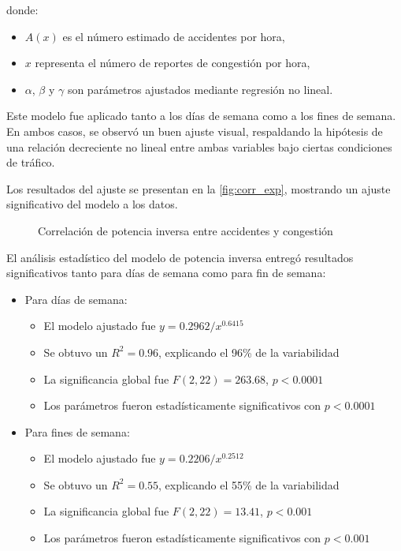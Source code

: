 \documentclass[12pt]{article}
\begin{document}
donde:
\begin{itemize}
    \item $A(x)$ es el número estimado de accidentes por hora,
    \item $x$ representa el número de reportes de congestión por hora,
    \item $\alpha$, $\beta$ y $\gamma$ son parámetros ajustados mediante regresión no lineal.
\end{itemize}

Este modelo fue aplicado tanto a los días de semana como a los fines de semana. En ambos casos, se observó un buen ajuste visual, respaldando la hipótesis de una relación decreciente no lineal entre ambas variables bajo ciertas condiciones de tráfico.

Los resultados del ajuste se presentan en la \autoref{fig:corr_exp}, mostrando un ajuste significativo del modelo a los datos.

\begin{figure}[H]
    \centering
    \newline
    \newline
    \caption{Correlación de potencia inversa entre accidentes y congestión}
    \label{fig:corr_exp}
\end{figure}

El análisis estadístico del modelo de potencia inversa entregó resultados significativos tanto para días de semana como para fin de semana:

\begin{itemize}
    \item Para días de semana:
    \begin{itemize}
        \item El modelo ajustado fue $y = 0.2962/x^{0.6415}$
        \item Se obtuvo un $R^2 = 0.96$, explicando el 96\% de la variabilidad
        \item La significancia global fue $F(2, 22) = 263.68$, $p < 0.0001$
        \item Los parámetros fueron estadísticamente significativos con $p < 0.0001$
    \end{itemize}

    \item Para fines de semana:
    \begin{itemize}
        \item El modelo ajustado fue $y = 0.2206/x^{0.2512}$
        \item Se obtuvo un $R^2 = 0.55$, explicando el 55\% de la variabilidad
        \item La significancia global fue $F(2, 22) = 13.41$, $p < 0.001$
        \item Los parámetros fueron estadísticamente significativos con $p < 0.001$
    \end{itemize}
\end{itemize}
\end{document}
